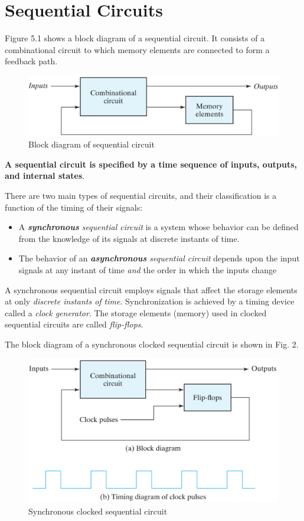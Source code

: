 \section{Sequential Circuits}

Figure 5.1 shows a block diagram of a sequential circuit. It consists of a combinational circuit to which memory elements are connected to form a feedback path.

\begin{figure}[H]
  \centering
  \includegraphics[width=\linewidth]{img/fig-5.1.png}
  \caption{Block diagram of sequential circuit}
  \label{fig:5.1}
\end{figure}

\textbf{A sequential circuit is specified by a time sequence of inputs, outputs, and internal states}.

There are two main types of sequential circuits, and their classification is a function of the timing of their signals:
\begin{itemize}
  \item A \textit{\textbf{synchronous} sequential circuit} is a system whose behavior can be defined from the knowledge of its signals at discrete instants of time.
  \item The behavior of an \textit{\textbf{asynchronous} sequential circuit} depends upon the input signals at any instant of  time \textit{and} the order in which the inputs change
\end{itemize}

A synchronous sequential circuit employs signals that affect the storage elements at only \textit{discrete instants of time}. Synchronization is achieved by a timing device called a \textit{clock generator}. The storage elements (memory) used in clocked sequential circuits are called \textit{flip-flops}.

The block diagram of a synchronous clocked sequential circuit is shown in 
Fig. 2.
\begin{figure}[H]
  \centering
  \includegraphics[width=\linewidth]{img/fig-5.2.png}
  \caption{Synchronous clocked sequential circuit}
  \label{fig:5.2}
\end{figure}

